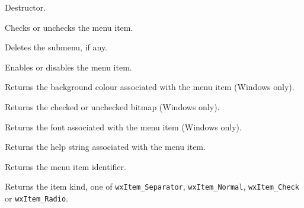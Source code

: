 Destructor.

\label{wxmenuitemcheck}


Checks or unchecks the menu item.

\label{wxmenuitemdeletesubmenu}


Deletes the submenu, if any.

\label{wxmenuitemenable}


Enables or disables the menu item.

\label{wxmenuitemgetbackgroundcolour}


Returns the background colour associated with the menu item (Windows only).

\label{wxmenuitemgetbitmap}


Returns the checked or unchecked bitmap (Windows only).

\label{wxmenuitemgetfont}


Returns the font associated with the menu item (Windows only).

\label{wxmenuitemgethelp}


Returns the help string associated with the menu item.

\label{wxmenuitemgetid}


Returns the menu item identifier.

\label{wxmenuitemgetkind}


Returns the item kind, one of {\tt wxItem\_Separator}, {\tt wxItem\_Normal}, 
{\tt wxItem\_Check} or {\tt wxItem\_Radio}.

